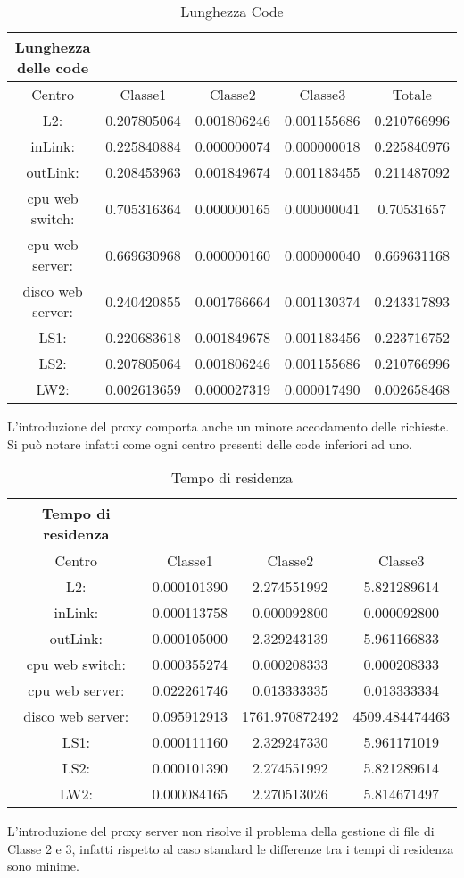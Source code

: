 \begin{table}[htbp]
\begin{center}
\begin{tabular}{|c|c|c|c|c|}
\hline
Lunghezza delle code\\
\hline
Centro &Classe1 &Classe2 &Classe3 &Totale\\
\hline
\hline
L2: &0.207805064 &0.001806246 &0.001155686 &0.210766996\\
\hline
inLink: &0.225840884 &0.000000074 &0.000000018 &0.225840976\\
\hline
outLink: &0.208453963 &0.001849674 &0.001183455 &0.211487092\\
\hline
cpu web switch: &0.705316364 &0.000000165 &0.000000041 &0.70531657\\
\hline
cpu web server: &0.669630968 &0.000000160 &0.000000040 &0.669631168\\
\hline
disco web server: &0.240420855 &0.001766664 &0.001130374 &0.243317893\\
\hline
LS1: &0.220683618 &0.001849678 &0.001183456 &0.223716752\\
\hline
LS2: &0.207805064 &0.001806246 &0.001155686 &0.210766996\\
\hline
LW2: &0.002613659 &0.000027319 &0.000017490 &0.002658468\\
\hline
\end{tabular}
\end{center}
\caption{Lunghezza Code}
\label{lunghezzacode}
\end{table}
L'introduzione del proxy comporta anche un minore accodamento delle richieste. Si può notare infatti come ogni centro presenti delle code inferiori ad uno.
\begin{table}[htbp]
\begin{center}
\begin{tabular}{|c|c|c|c|}
\hline
Tempo di residenza\\
\hline
Centro &Classe1 &Classe2 &Classe3\\
\hline
\hline
L2: &0.000101390 &2.274551992 &5.821289614\\
\hline
inLink: &0.000113758 &0.000092800 &0.000092800\\
\hline
outLink: &0.000105000 &2.329243139 &5.961166833\\
\hline
cpu web switch: &0.000355274 &0.000208333 &0.000208333\\
\hline
cpu web server: &0.022261746 &0.013333335 &0.013333334\\
\hline
disco web server: &0.095912913 &1761.970872492 &4509.484474463\\
\hline
LS1: &0.000111160 &2.329247330 &5.961171019\\
\hline
LS2: &0.000101390 &2.274551992 &5.821289614\\
\hline
LW2: &0.000084165 &2.270513026 &5.814671497\\
\hline
\end{tabular}
\end{center}
\caption{Tempo di residenza}
\label{tempodiresidenza}
\end{table}
L'introduzione del proxy server non risolve il problema della gestione di file di Classe 2 e 3, infatti rispetto al caso standard le differenze tra i tempi di residenza sono minime.
